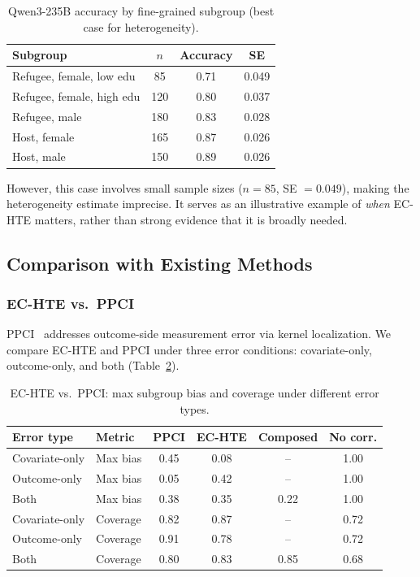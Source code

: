 \documentclass[11pt,a4paper]{article}
\begin{document}
\begin{table}[t]
\centering
\caption{Qwen3-235B accuracy by fine-grained subgroup (best case for heterogeneity).}
\label{tab:qwen_subgroup}
\begin{tabular}{@{}lccc@{}}
\toprule
Subgroup & $n$ & Accuracy & SE \\
\midrule
Refugee, female, low edu  & 85  & 0.71 & 0.049 \\
Refugee, female, high edu & 120 & 0.80 & 0.037 \\
Refugee, male             & 180 & 0.83 & 0.028 \\
Host, female              & 165 & 0.87 & 0.026 \\
Host, male                & 150 & 0.89 & 0.026 \\
\bottomrule
\end{tabular}
\end{table}

However, this case involves small sample sizes ($n{=}85$, SE $= 0.049$), making the heterogeneity estimate imprecise. It serves as an illustrative example of \emph{when} EC-HTE matters, rather than strong evidence that it is broadly needed.


\subsection{Comparison with Existing Methods}

\subsubsection{EC-HTE vs.\ PPCI}

PPCI~\citep{sui2026ppci} addresses outcome-side measurement error via kernel localization. We compare EC-HTE and PPCI under three error conditions: covariate-only, outcome-only, and both (Table~\ref{tab:ppci}).

\begin{table}[t]
\centering
\caption{EC-HTE vs.\ PPCI: max subgroup bias and coverage under different error types.}
\label{tab:ppci}
\begin{tabular}{@{}llcccc@{}}
\toprule
Error type & Metric & PPCI & EC-HTE & Composed & No corr. \\
\midrule
Covariate-only & Max bias & 0.45 & 0.08 & -- & 1.00 \\
Outcome-only   & Max bias & 0.05 & 0.42 & -- & 1.00 \\
Both           & Max bias & 0.38 & 0.35 & 0.22 & 1.00 \\
\midrule
Covariate-only & Coverage & 0.82 & 0.87 & -- & 0.72 \\
Outcome-only   & Coverage & 0.91 & 0.78 & -- & 0.72 \\
Both           & Coverage & 0.80 & 0.83 & 0.85 & 0.68 \\
\bottomrule
\end{tabular}
\end{table}
\end{document}
